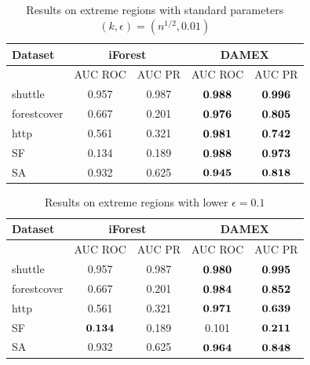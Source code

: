 \begin{table}[!ht]
\centering
\begin{tabular}{|l|cc|cc|}
  \hline
Dataset      &\multicolumn{2}{c|}{iForest}& \multicolumn{2}{c|}{DAMEX}\\\hline
~            &AUC ROC       & AUC PR     &AUC ROC     &AUC PR       \\
shuttle      & 0.957        & 0.987      &$\mathbf{0.988}$&$\mathbf{0.996}$ \\
forestcover  & 0.667        & 0.201      &$\mathbf{0.976}$&$\mathbf{0.805}$ \\
http         & 0.561        & 0.321      &$\mathbf{0.981}$&$\mathbf{0.742}$ \\
SF           & 0.134        & 0.189      &$\mathbf{0.988}$&$\mathbf{0.973}$ \\
SA           & 0.932        &0.625       &$\mathbf{0.945}$&$\mathbf{0.818}$ \\ 
\hline
\end{tabular}
\caption{Results on extreme regions with standard parameters $(k,\epsilon) = (n^{1/2}, 0.01)$}
\label{jmva:table:results-dbad+iforest-01}
\end{table}


\begin{table}[!ht]
\centering
\begin{tabular}{|l|cc|cc|}
  \hline
Dataset      &\multicolumn{2}{c|}{iForest}& \multicolumn{2}{c|}{DAMEX}\\\hline
~            &AUC ROC       & AUC PR     &AUC ROC     &AUC PR       \\
shuttle      & 0.957        & 0.987      &$\mathbf{0.980}$&$\mathbf{0.995}$ \\
forestcover  & 0.667        & 0.201      &$\mathbf{0.984}$&$\mathbf{0.852}$ \\
http         & 0.561        & 0.321      &$\mathbf{0.971}$&$\mathbf{0.639}$ \\
SF           & $\mathbf{0.134}$ & 0.189      &0.101       &$\mathbf{0.211}$ \\
SA           & 0.932        &0.625       &$\mathbf{0.964}$&$\mathbf{0.848}$ \\ 
\hline
\end{tabular}
\caption{Results on extreme regions with lower $\epsilon=0.1$}
\label{jmva:table:results-dbad+iforest-1}
\end{table}


